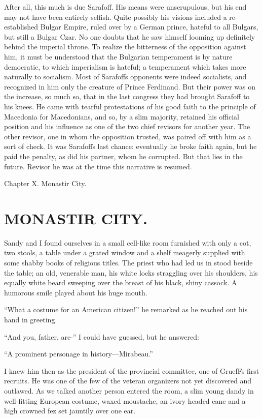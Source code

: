 \documentclass[a5paper,12pt]{book}
\begin{document}
After all, this much is due Sarafoff. His means were unscrupulous, but his end may not have been entirely selfish. Quite possibly his visions included a re-established Bulgar Empire, ruled over by a German prince, hateful to all Bulgars, but still a Bulgar Czar. No one doubts that he saw himself looming up definitely behind the imperial throne. To realize the bitterness of the opposition against him, it must be understood that the Bulgarian temperament is by nature democratic, to which imperialism is hateful; a temperament which takes more naturally to socialism. Most of Sarafoffs opponents were indeed socialists, and recognized in him only the creature of Prince Ferdinand. But their power was on the increase, so much so, that in the last congress they had brought Sarafoff to his knees. He came with tearful protestations of his good faith to the principle of Macedonia for Macedonians, and so, by a slim majority, retained his official position and his influence as one of the two chief revisors for another year. The other revisor, one in whom the opposition trusted, was paired off with him as a sort of check. It was Sarafoffs last chance: eventually he broke faith again, but he paid the penalty, as did his partner, whom he corrupted. But that lies in the future. Revisor he was at the time this narrative is resumed.

Chapter X. Monastir City.


\chapter{MONASTIR CITY.}

Sandy and I found ourselves in a small cell-like room furnished with only a cot, two stools, a table under a grated window and a shelf meagerly supplied with some shabby books of religious titles. The priest who had led us in stood beside the table; an old, venerable man, his white locks straggling over his shoulders, his equally white beard sweeping over the breast of his black, shiny cassock. A humorous smile played about his huge mouth.

“What a costume for an American citizen!” he remarked as he reached out his hand in greeting.

“And you, father, are-” I could have guessed, but he answered:

“A prominent personage in history—Mirabeau.”

I knew him then as the president of the provincial committee, one of GruefFs first recruits. He was one of the few of the veteran organizers not yet discovered and outlawed. As we talked another person entered the room, a slim young dandy in well-fitting European costume, waxed moustache, an ivory headed cane and a high crowned fez set jauntily over one ear.
\end{document}
